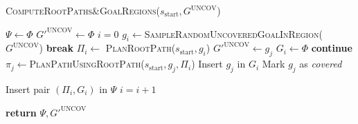 \documentclass[letterpaper]{article} %
\begin{document}
\begin{algorithm}
\caption{\textsc{ComputeRootPaths$\&$GoalRegions}($s_{\textrm{start}}, G^{\textrm{UNCOV}}$)}\label{alg:4}
\begin{algorithmic}[1]
\State $\Psi \leftarrow \Phi$   
\State $G'^{\textrm{UNCOV}} \leftarrow \Phi$
\State $i = 0$
    
    \State $g_i \leftarrow$\textsc{SampleRandomUncoveredGoalInRegion}($G^{\textrm{UNCOV}}$)
        \State \textbf{break}
    \EndIf
    \State $\Pi_i \leftarrow$ \textsc{PlanRootPath}($s_{\textrm{start}}, g_i$)
      
        \State $G'^{\textrm{UNCOV}} \leftarrow g_j$
    \EndIf
    \State $G_i \leftarrow \Phi$
            \State \textbf{continue}
        \EndIf
        \State $\pi_j \leftarrow$\textsc{PlanPathUsingRootPath}($s_{\textrm{start}},g_j,\Pi_i$)
         
            \State Insert $g_j$ in $G_i$
            \State Mark $g_j$ as \emph{covered}
        \EndIf
        
    \EndFor
    \State Insert pair $(\Pi_i, G_i)$ in $\Psi$
    \State $i = i + 1$

\EndWhile
\State \textbf{return} $\Psi, G'^{\textrm{UNCOV}}$
\end{algorithmic}
\end{algorithm}
\end{document}
